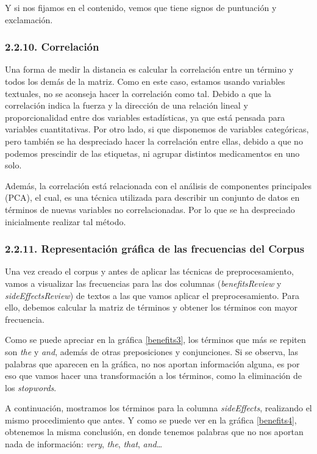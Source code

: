 \documentclass[spanish,]{article}
\begin{document}
Y si nos fijamos en el contenido, vemos que tiene signos de puntuación y
exclamación.

\subsubsection{2.2.10. Correlación}\label{correlacion}

Una forma de medir la distancia es calcular la correlación entre un
término y todos los demás de la matriz. Como en este caso, estamos
usando variables textuales, no se aconseja hacer la correlación como
tal. Debido a que la correlación indica la fuerza y la dirección de una
relación lineal y proporcionalidad entre dos variables estadísticas, ya
que está pensada para variables cuantitativas. Por otro lado, si que
disponemos de variables categóricas, pero también se ha despreciado
hacer la correlación entre ellas, debido a que no podemos prescindir de
las etiquetas, ni agrupar distintos medicamentos en uno solo.

Además, la correlación está relacionada con el análisis de componentes
principales (PCA), el cual, es una técnica utilizada para describir un
conjunto de datos en términos de nuevas variables no correlacionadas.
Por lo que se ha despreciado inicialmente realizar tal método.

\subsubsection{2.2.11. Representación gráfica de las frecuencias del
Corpus}\label{representacion-grafica-de-las-frecuencias-del-corpus}

Una vez creado el corpus y antes de aplicar las técnicas de
preprocesamiento, vamos a visualizar las frecuencias para las dos
columnas (\emph{benefitsReview} y \emph{sideEffectsReview}) de textos a
las que vamos aplicar el preprocesamiento. Para ello, debemos calcular
la matriz de términos y obtener los términos con mayor frecuencia.

Como se puede apreciar en la gráfica \ref{benefits3}, los términos que
más se repiten son \emph{the} y \emph{and}, además de otras
preposiciones y conjunciones. Si se observa, las palabras que aparecen
en la gráfica, no nos aportan información alguna, es por eso que vamos
hacer una transformación a los términos, como la eliminación de los
\emph{stopwords}.

A continuación, mostramos los términos para la columna
\emph{sideEffects}, realizando el mismo procedimiento que antes. Y como
se puede ver en la gráfica \ref{benefits4}, obtenemos la misma
conclusión, en donde tenemos palabras que no nos aportan nada de
información: \emph{very}, \emph{the}, \emph{that}, \emph{and}\ldots{}
\end{document}
